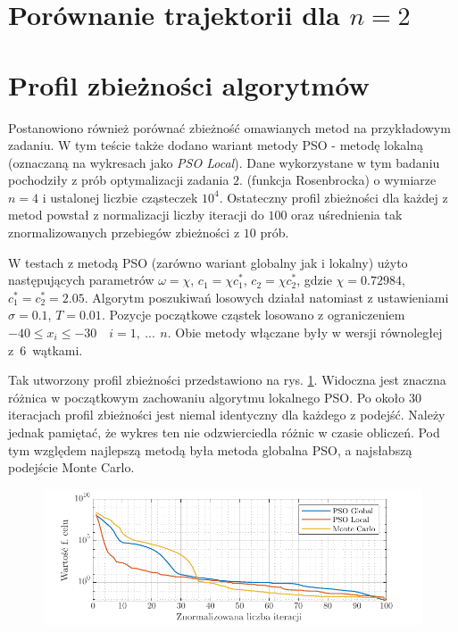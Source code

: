 \documentclass[11pt, a4paper, oneside]{article}
\begin{document}
\section{Porównanie trajektorii dla $n = 2$}

\section{Profil zbieżności algorytmów}

Postanowiono również porównać zbieżność omawianych metod na przykładowym zadaniu. W tym teście także dodano wariant metody PSO - metodę lokalną (oznaczaną na wykresach jako \textit{PSO Local}). Dane wykorzystane w tym badaniu pochodziły z prób optymalizacji zadania $2.$ (funkcja Rosenbrocka) o wymiarze $n = 4$ i ustalonej liczbie cząsteczek $10^{4}$. Ostateczny profil zbieżności dla każdej z metod powstał z normalizacji liczby iteracji do $100$ oraz uśrednienia tak znormalizowanych przebiegów zbieżności z $10$ prób.

W testach z metodą PSO (zarówno wariant globalny jak i lokalny) użyto następujących parametrów $\omega = \chi$, $c_1 = \chi c_1^*$, $c_2 = \chi c_2^*$, gdzie $\chi = 0.72984$, $c_1^* = c_2^* = 2.05$. Algorytm poszukiwań losowych działał natomiast z ustawieniami $\sigma = 0.1$, $T = 0.01$. Pozycje początkowe cząstek losowano z ograniczeniem $-40 \leq x_i \leq -30 \quad i = 1, \ ...\, \ n$. Obie metody włączane były w wersji równoległej z~$6$~wątkami.

Tak utworzony profil zbieżności przedstawiono na rys. \ref{fig:zbieznosc}. Widoczna jest znaczna różnica w początkowym zachowaniu algorytmu lokalnego PSO. Po około $30$ iteracjach profil zbieżności jest niemal identyczny dla każdego z podejść. Należy jednak pamiętać, że wykres ten nie odzwierciedla różnic w czasie obliczeń. Pod tym względem najlepszą metodą była metoda globalna PSO, a najsłabszą podejście Monte Carlo.

\begin{figure}[h]
\centerline{\includegraphics[width=\dimexpr.9\textwidth-1em]{grafiki/zbieznosc_porownanie.pdf}}
\label{fig:zbieznosc}
\end{figure}
\end{document}
